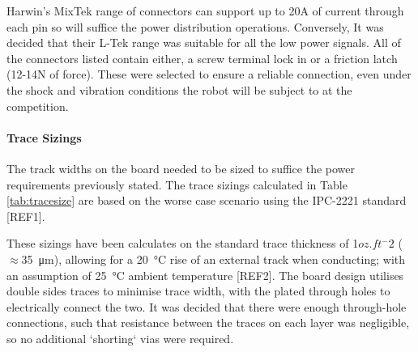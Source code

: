 Harwin’s MixTek range of connectors can support up to 20A of current through each pin so will suffice the power distribution operations. Conversely, It was decided that their L-Tek range was suitable for all the low power signals. All of the connectors listed contain either, a screw terminal lock in or a friction latch (12-14N of force). These were selected to ensure a reliable connection, even under the shock and vibration conditions the robot will be subject to at the competition.\par

\paragraph{Trace Sizings}
The track widths on the board needed to be sized to suffice the power requirements previously stated. The trace sizings calculated in Table \ref{tab:tracesize} are based on the worse case scenario using the IPC-2221 standard [REF1].\par

\begin{table}[ht]
\caption{Trace Sizings Required for each Power Line}
\label{tab:tracesize}
\end{table}

These sizings have been calculates on the standard trace thickness of 1$oz.ft^-2$ ($\approx$\SI{35}{\micro\meter}), allowing for a \SI{20}{\degree}C  rise of an external track when conducting; with an assumption of \SI{25}{\degree}C ambient temperature [REF2]. The board design utilises double sides traces to minimise trace width, with the plated through holes to electrically connect the two. It was decided that there were enough through-hole connections, such that resistance between the traces on each layer was negligible, so no additional ‘shorting‘ vias were required.\par

